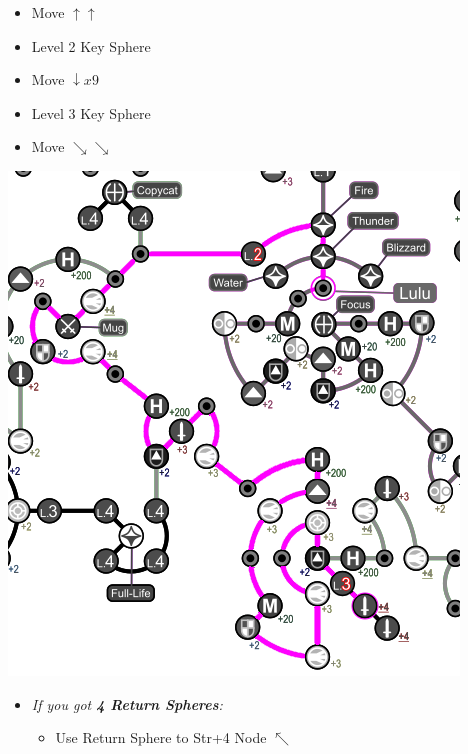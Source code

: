 \begin{spheregrid}
    \begin{multicols}{2}
        \begin{itemize}
            \luluf
            \begin{itemize}
                \item Move $\uparrow\uparrow$
                \item Level 2 Key Sphere
                \item Move $\downarrow x9$
                \item Level 3 Key Sphere
                \item Move $\searrow\searrow$
            \end{itemize}
            \includegraphics[width=.75\columnwidth]{graphics/lulu_grid}
            \yunaf
            \begin{itemize}
                \item \textit{If you got \textbf{4 Return Spheres}:}
                    \begin{itemize}
                        \item Use Return Sphere to Str+4 Node $\nwarrow$
\end{itemize}
\end{itemize}
\end{itemize}
\end{multicols}
\end{spheregrid}
